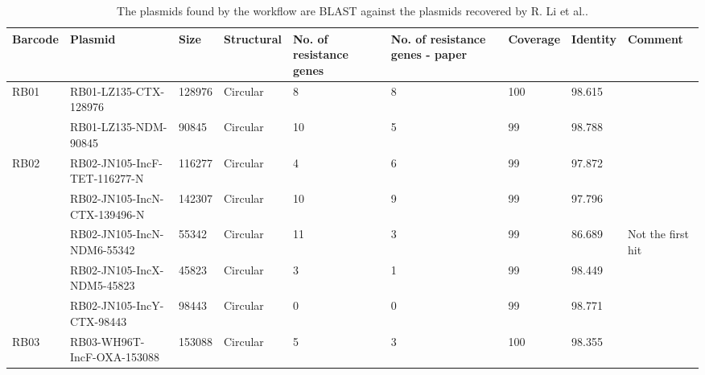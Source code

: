 \documentclass[a4paper,num-refs]{oup-contemporary}
\begin{document}
\begin{landscape}
\begin{table}
\caption{The plasmids found by the workflow are BLAST against the plasmids recovered by R. Li et al..}\label{tab:LiEtAl}
\begin{tabular}{l l l l l l l l l}
\toprule
\textbf{Barcode}         & \textbf{Plasmid}                   & \textbf{Size} & \textbf{Structural} & \textbf{No. of resistance genes} & \textbf{No. of resistance genes - paper} & \textbf{Coverage} & \textbf{Identity} & \textbf{Comment}  \\
\midrule
RB01                     & RB01-LZ135-CTX-128976              & 128976        & Circular            & 8                                & 8                                        & 100               & 98.615            &                   \\
                         & RB01-LZ135-NDM-90845               & 90845         & Circular            & 10                               & 5                                        & 99                & 98.788            &                   \\
RB02                     & RB02-JN105-IncF-TET-116277-N       & 116277        & Circular            & 4                                & 6                                        & 99                & 97.872            &                   \\
                         & RB02-JN105-IncN-CTX-139496-N       & 142307        & Circular            & 10                               & 9                                        & 99                & 97.796            &                   \\
                         & RB02-JN105-IncN-NDM6-55342         & 55342         & Circular            & 11                               & 3                                        & 99                & 86.689            & Not the first hit \\
                         & RB02-JN105-IncX-NDM5-45823         & 45823         & Circular            & 3                                & 1                                        & 99                & 98.449            &                   \\
                         & RB02-JN105-IncY-CTX-98443          & 98443         & Circular            & 0                                & 0                                        & 99                & 98.771            &                   \\
RB03                     & RB03-WH96T-IncF-OXA-153088         & 153088        & Circular            & 5                                & 3                                        & 100               & 98.355            &                   \\

\end{tabular}
\end{table}
\end{landscape}
\end{document}
